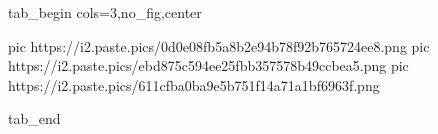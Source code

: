  
 
 
 
 


\ifcmt
  tab_begin cols=3,no_fig,center

     pic https://i2.paste.pics/0d0e08fb5a8b2e94b78f92b765724ee8.png
		 pic https://i2.paste.pics/ebd875c594ee25fbb357578b49ccbea5.png
		 pic https://i2.paste.pics/611cfba0ba9e5b751f14a71a1bf6963f.png

  tab_end
\fi
